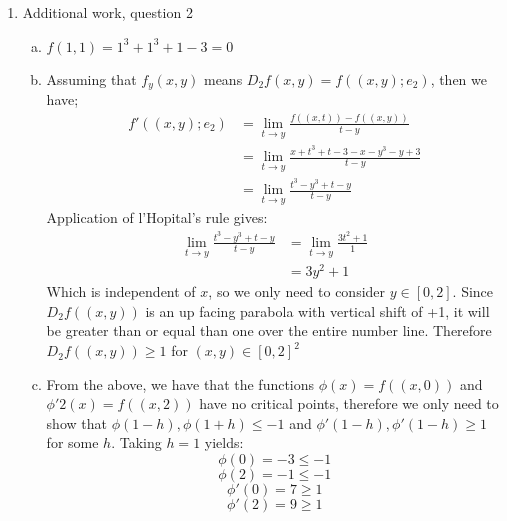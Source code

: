 \documentclass[letterpaper,10pt]{article}
\begin{document}
\begin{enumerate}
	\item Additional work, question 2
	\begin{enumerate}[a)]
		\item $f(1,1) = 1^3 + 1^3 + 1 -  3 = 0$
		\item Assuming that $f_y(x,y)$ means $D_2 f(x,y) = f((x,y); e_2)$, then we have;
		\begin{align*}
			f'((x, y); e_2) & =  \lim_{t \to y} \frac{f((x, t)) - f((x,y))}{t-y} \\
			& =  \lim_{t \to y} \frac{x + t^3 + t - 3 - x - y^3 - y + 3}{t-y} \\
			& =  \lim_{t \to y} \frac{t^3 - y^3 + t - y}{t-y} 
		\end{align*}
		Application of l'Hopital's rule gives:
		\begin{align*}
			\lim_{t \to y} \frac{t^3 - y^3 + t - y}{t-y} & = \lim_{t \to y} \frac{3t^2 + 1}{1} \\
			& = 3y^2 + 1
		\end{align*}
		Which is independent of $x$, so we only need to consider $y \in [0, 2]$. Since $D_2 f((x,y))$ is an up facing parabola with vertical shift of +1, it will be greater than or equal than one over the entire number line. Therefore $D_2 f ((x,y)) \geq 1$ for $(x,y) \in [0,2]^2$
		\item From the above, we have that the functions $\phi(x) = f((x, 0))$ and $\phi'2(x) = f((x, 2))$ have no critical points, therefore we only need to show that $\phi(1-h),\phi(1+h) \leq -1$ and $\phi'(1-h),\phi'(1-h) \geq 1$ for some $h$. Taking $h = 1$ yields:
		$$ \phi(0) = -3 \leq -1$$
		$$ \phi(2) = -1 \leq -1$$
		$$ \phi'(0) = 7 \geq 1$$
		$$ \phi'(2) = 9 \geq 1$$
		\begin{align*}
		\end{align*}
	\end{enumerate}


\end{enumerate}
\end{document}
